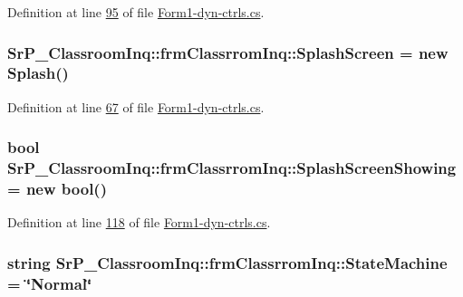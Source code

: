 \-Definition at line \hyperlink{_form1-dyn-ctrls_8cs_source_l00095}{95} of file \hyperlink{_form1-dyn-ctrls_8cs_source}{\-Form1-\/dyn-\/ctrls.\-cs}.

\hypertarget{class_sr_p___classroom_inq_1_1frm_classrrom_inq_a98e4b48609bbf222068559db81f53f9d}{
\subsubsection[{\-Splash\-Screen}]{ {\bf \-Sr\-P\-\_\-\-Classroom\-Inq\-::frm\-Classrrom\-Inq\-::\-Splash\-Screen} = new {\bf \-Splash}()}}
\label{class_sr_p___classroom_inq_1_1frm_classrrom_inq_a98e4b48609bbf222068559db81f53f9d}


\-Definition at line \hyperlink{_form1-dyn-ctrls_8cs_source_l00067}{67} of file \hyperlink{_form1-dyn-ctrls_8cs_source}{\-Form1-\/dyn-\/ctrls.\-cs}.

\hypertarget{class_sr_p___classroom_inq_1_1frm_classrrom_inq_a7e52871d9da2c0a9364fd22a8743d7bd}{
\subsubsection[{\-Splash\-Screen\-Showing}]{\setlength{\rightskip}{0pt plus 5cm}bool {\bf \-Sr\-P\-\_\-\-Classroom\-Inq\-::frm\-Classrrom\-Inq\-::\-Splash\-Screen\-Showing} = new bool()}}
\label{class_sr_p___classroom_inq_1_1frm_classrrom_inq_a7e52871d9da2c0a9364fd22a8743d7bd}


\-Definition at line \hyperlink{_form1-dyn-ctrls_8cs_source_l00118}{118} of file \hyperlink{_form1-dyn-ctrls_8cs_source}{\-Form1-\/dyn-\/ctrls.\-cs}.

\hypertarget{class_sr_p___classroom_inq_1_1frm_classrrom_inq_a4858c67d60a267f02e6c97085f2aee71}{
\subsubsection[{\-State\-Machine}]{\setlength{\rightskip}{0pt plus 5cm}string {\bf \-Sr\-P\-\_\-\-Classroom\-Inq\-::frm\-Classrrom\-Inq\-::\-State\-Machine} = \char`\"{}\-Normal\char`\"{}}}
\label{class_sr_p___classroom_inq_1_1frm_classrrom_inq_a4858c67d60a267f02e6c97085f2aee71}


